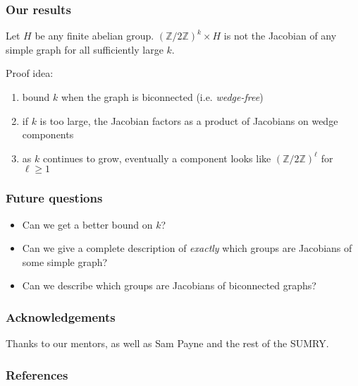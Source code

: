 \documentclass[mathserif, serif, xcolor=dvipsnames]{beamer}
\newcommand{\Z}{\ensuremath{\mathbb{Z}}}
\begin{document}
\begin{frame}
  \frametitle{Our results}
  \begin{theorem}
    Let $H$ be any finite abelian group.  $(\Z/2\Z)^k \times H$ is not
    the Jacobian of any simple graph for all sufficiently large $k$.
  \end{theorem}

  \pause 

  Proof idea: 
  \begin{enumerate}
  \item bound $k$ when the graph is biconnected
    (i.e. \emph{wedge-free})
    \pause
  \item if $k$ is too large, the Jacobian factors as a product of
    Jacobians on wedge components
    \pause
  \item as $k$ continues to grow, eventually a component looks like
    $(\Z/2\Z)^\ell$ for $\ell \ge 1$
  \end{enumerate}

\end{frame}

\begin{frame}
  \frametitle{Future questions}
  \begin{itemize}
    \item Can we get a better bound on $k$?
      \pause
    \item Can we give a complete description of \emph{exactly} which
      groups are Jacobians of some simple graph?
      \pause
    \item Can we describe which groups are Jacobians of biconnected
      graphs?
  \end{itemize}
\end{frame}

\begin{frame}
  \frametitle{Acknowledgements}

  Thanks to our mentors, as well as Sam Payne and the rest of the
  SUMRY.
  
\end{frame}

\begin{frame}
  \frametitle{References}
\end{frame}
\end{document}
